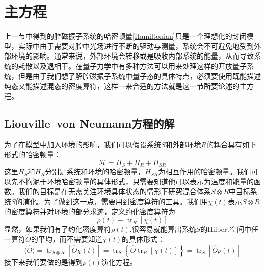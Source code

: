 \section{主方程}
\label{secMaster}
上一节中得到的腔磁振子系统的哈密顿量\eqref{Hamiltonian}只是一个理想化的封闭模型，实际中由于需要对腔中光场进行不断的驱动与测量，系统会不可避免地受到外部环境的影响。通常来说，外部环境会转移或是吸收内部系统的能量，从而导致系统的耗散以及退相干。在量子力学中有多种方法可以用来处理这样的开放量子系统，但是由于我们想了解腔磁振子系统中量子态的具体特点，必须要使用既能描述纯态又能描述混态的密度算符，这样一来合适的方法就是这一节所要论述的主方程。

\subsection{Liouville--von Neumann方程的解}
为了在模型中加入环境的影响，我们可以假设系统$S$和外部环境$R$的耦合具有如下形式的哈密顿量：
\begin{equation}
\mathcal{H}=H_{S}+H_{R}+H_{S R}
\label{Hsr}
\end{equation}
这里$H_{S}$和$H_{R}$分别是系统和环境的哈密顿量，$H_{SR}$为相互作用的哈密顿量。我们可以先不拘泥于环境哈密顿量的具体形式，只需要知道他可以表示为温度和能量的函数。我们的目标是在无需关注环境具体状态的情形下研究混合体系$S \otimes R$中目标系统$S$的演化。为了做到这一点，需要用到密度算符的工具。我们用$\chi(t)$表示$S \otimes R$的密度算符并对环境的部分求迹，定义约化密度算符为
\begin{equation}
\rho(t) \equiv \operatorname{tr}_{R}[\chi(t)]
\end{equation}
显然，如果我们有了约化密度算符$\rho(t)$,很容易就能算出系统$S$的Hilbert空间中任一算符$\hat{O}$的平均，而不需要知道$\chi(t)$的具体形式：
\begin{equation}
\langle\hat{O}\rangle=\operatorname{tr}_{S \otimes R}[\hat{O} \chi(t)]=\operatorname{tr}_{S}\left\{\hat{O} \operatorname{tr}_{R}[\chi(t)]\right\}=\operatorname{tr}_{S}[\hat{O} \rho(t)]
\end{equation}
接下来我们要做的是得到$\rho(t)$演化方程。

